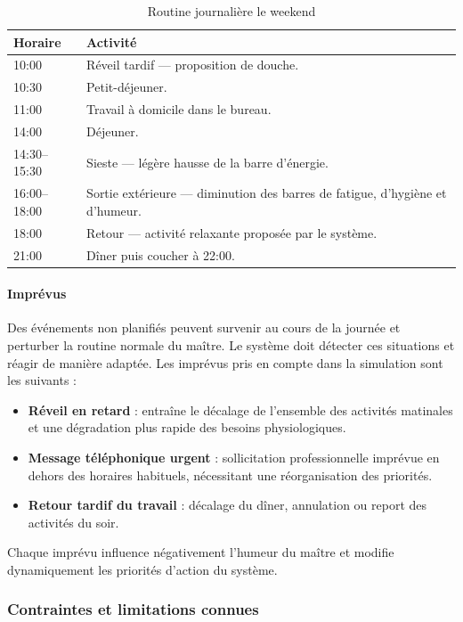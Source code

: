 \begin{table}[h!]
\centering
\begin{tabular}{|p{2.5cm}|p{9.5cm}|}
\hline
\textbf{Horaire} & \textbf{Activité} \\
\hline
10:00 & Réveil tardif — proposition de douche. \\
\hline
10:30 & Petit-déjeuner. \\
\hline
11:00 & Travail à domicile dans le bureau. \\
\hline
14:00 & Déjeuner. \\
\hline
14:30--15:30 & Sieste — légère hausse de la barre d'énergie. \\
\hline
16:00--18:00 & Sortie extérieure — diminution des barres de fatigue, d'hygiène 
et d'humeur. \\
\hline
18:00 & Retour — activité relaxante proposée par le système. \\
\hline
21:00 & Dîner puis coucher à 22:00. \\
\hline
\end{tabular}
\caption{Routine journalière le weekend}
\label{tab:weekend}
\end{table}

\paragraph{Imprévus} Des événements non planifiés peuvent survenir au cours de la journée 
et perturber la routine normale du maître. Le système doit détecter ces situations et 
réagir de manière adaptée. Les imprévus pris en compte dans la simulation sont les suivants :
\begin{itemize}
    \item \textbf{Réveil en retard} : entraîne le décalage de l'ensemble des activités 
    matinales et une dégradation plus rapide des besoins physiologiques.
    \item \textbf{Message téléphonique urgent} : sollicitation professionnelle imprévue 
    en dehors des horaires habituels, nécessitant une réorganisation des priorités.
    \item \textbf{Retour tardif du travail} : décalage du dîner, annulation ou report 
    des activités du soir.
\end{itemize}
Chaque imprévu influence négativement l'humeur du maître et modifie dynamiquement 
les priorités d'action du système.

\subsubsection{Contraintes et limitations connues}

